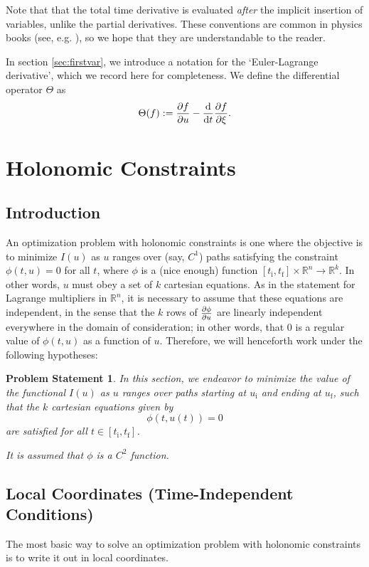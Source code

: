 \documentclass{article}
\theoremstyle{plain}
\theoremstyle{plain}
\theoremstyle{nonumberplain}
\newtheorem{statement}{Problem Statement}
\theoremstyle{empty}
\newcommand{\R}{\mathbb{R}}
\newcommand{\tstart}{\mathrm{i}}
\newcommand{\tend}{\mathrm{f}}
\begin{document}
Note that that the total time derivative is evaluated \emph{after} the implicit insertion of variables, unlike the partial derivatives. These conventions are common in physics books (see, e.g. \cite{goldstein}), so we hope that they are understandable to the reader.

In section \ref{sec:firstvar}, we introduce a notation for the `Euler-Lagrange derivative', which we record here for completeness. We define the differential operator $\Theta$ as
\[\Theta(f) := \diffp f u - \diff*{\diffp f \xi}t.\]

\section{Holonomic Constraints}

\subsection{Introduction}

An optimization problem with holonomic constraints is one where the objective is to minimize $I(u)$ as $u$ ranges over (say, $C^1$) paths satisfying the constraint $\phi(t, u) = 0$ for all $t$, where $\phi$ is a (nice enough) function $[t_\tstart, t_\tend] \times \R^n \to \R^k$. In other words, $u$ must obey a set of $k$ cartesian equations. As in the statement for Lagrange multipliers in $\R^n$, it is necessary to assume that these equations are independent, in the sense that the $k$ rows of $\diffp \phi u$ are linearly independent everywhere in the domain of consideration; in other words, that 0 is a regular value of $\phi(t, u)$ as a function of $u$. Therefore, we will henceforth work under the following hypotheses:

\begin{statement}
In this section, we endeavor to minimize the value of the functional $I(u)$ as $u$ ranges over paths starting at $u_\tstart$ and ending at $u_\tend$, such that the $k$ cartesian equations given by
\[\phi(t, u(t)) = 0\]
are satisfied for all $t \in [t_\tstart, t_\tend]$.

It is assumed that $\phi$ is a $C^2$ function.
\end{statement}

\subsection{Local Coordinates (Time-Independent Conditions)}

The most basic way to solve an optimization problem with holonomic constraints is to write it out in local coordinates.
\end{document}

